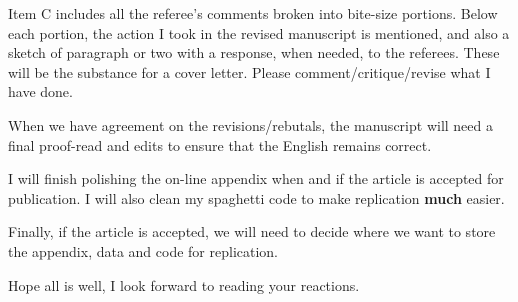 \documentclass{article}
\begin{document}
\begin{enumerate}
Item C includes all the referee's comments broken into bite-size portions. Below each portion, the action I took in the revised manuscript is mentioned, and also a sketch of paragraph or two with a response, when needed, to the referees. These will be the substance for a cover letter. Please comment/critique/revise what I have done. 

When we have agreement on the revisions/rebutals, the manuscript will need a final proof-read and edits to ensure that the English remains correct.

I will finish polishing the on-line appendix when and if the article is accepted for publication. I will also clean my spaghetti code to make replication \textbf{much} easier. 

Finally, if the article is accepted, we will need to decide where we want to store the appendix, data and code for replication. 

Hope all is well, I look forward to reading your reactions.
\end{enumerate}
\end{document}
